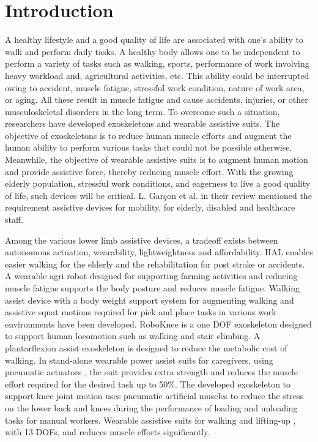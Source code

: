 \documentclass[paper,JRM,paper]{jaciiiarticle}
\begin{document}
\section{Introduction}

A healthy lifestyle and a good quality of life are associated with one’s ability to walk and perform daily tasks. A healthy body allows one to be independent to perform a variety of tasks such as walking, sports, performance of work involving heavy workload and, agricultural activities, etc. This ability could be interrupted owing to accident, muscle fatigue, stressful work condition, nature of work area, or aging. All these result in muscle fatigue and cause accidents, injuries, or other musculoskeletal disorders in the long term. To overcome such a situation, researchers have developed exoskeletons and wearable assistive suits. The objective of exoskeletons is to reduce human muscle efforts and augment the human ability to perform various tasks that could not be possible otherwise. Meanwhile, the objective of wearable assistive suits is to augment human motion and provide assistive force, thereby reducing muscle effort. With the growing elderly population, stressful work conditions, and eagerness to live a good quality of life, such devices will be critical. L. Garçon et al. \cite{1} in their review mentioned the requirement assistive devices for mobility, for elderly, disabled and healthcare staff.

Among the various lower limb assistive devices, a tradeoff exists between autonomous actuation, wearability, lightweightness and affordability. HAL \cite{2} enables easier walking for the elderly and the rehabilitation for post stroke or accidents. A wearable agri robot \cite{3} designed for supporting farming activities and reducing muscle fatigue supports the body posture and reduces muscle fatigue. Walking assist device with a body weight support system \cite{4} for augmenting walking and assistive squat motions required for pick and place tasks in various work environments have been developed. RoboKnee \cite{5} is a one DOF exoskeleton designed to support human locomotion such as walking and stair climbing. A plantarflexion assist exoskeleton \cite{6} is designed to reduce the metabolic cost of walking. In stand-alone wearable power assist suits for caregivers, using pneumatic actuators \cite{7}, the suit provides extra strength and reduces the muscle effort required for the desired task up to 50\%. The developed exoskeleton to support knee joint motion \cite{8} uses pneumatic artificial muscles to reduce the stress on the lower back and knees during the performance of loading and unloading tasks for manual workers. Wearable assistive suits for walking and lifting-up \cite{9}, with 13 DOFs, and reduces muscle efforts significantly. 
\end{document}
